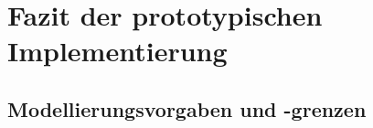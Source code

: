 \section{Fazit der prototypischen Implementierung}

\subsection{Modellierungsvorgaben und -grenzen}
\label{subsec:modellierungsgrenzen}


